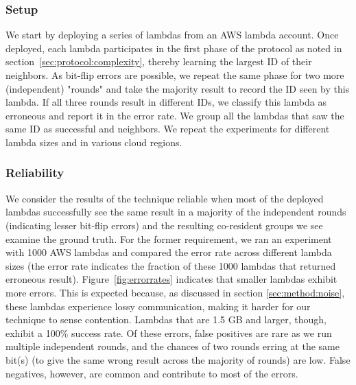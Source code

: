 \subsubsection{Setup}
\label{subsec:expsetup}
We start by deploying a series of lambdas from an AWS lambda account.  Once
deployed, each lambda participates in the first phase of the protocol as noted
in section~\ref{sec:protocol:complexity}, thereby learning the largest ID of
their neighbors. As bit-flip errors are possible, we repeat the same phase for
two more (independent) "rounds" and take the majority result to record the ID
seen by this lambda.  If all three rounds result in different IDs, we classify
this lambda as erroneous and report it in the error rate. We group all the
lambdas that saw the same ID as successful and neighbors. We repeat the
experiments for different lambda sizes and in various cloud regions.

\subsubsection{Reliability}
We consider the results of the technique reliable when most of the deployed
lambdas successfully see the same result in a majority of the independent rounds
(indicating lesser bit-flip errors) and the resulting co-resident groups we
see examine the ground truth.  For the former requirement, 
we ran an experiment with 1000 AWS
lambdas and compared the error rate across different lambda sizes (the error
rate indicates the fraction of these 1000 lambdas that returned erroneous result).
Figure~\ref{fig:errorrates} 
indicates that smaller lambdas exhibit
more errors.  This is expected because, as discussed in section
\ref{sec:method:noise}, these lambdas experience lossy communication, making it
harder for our technique to sense contention. Lambdas that are 1.5 GB and
larger, though, exhibit a 100\% success rate. Of these errors, false positives are 
rare as we run multiple independent rounds, and the chances of two rounds erring at 
the same bit(s) (to give the same wrong result across the majority of rounds) are low. 
False negatives, however, are common and contribute to most of the errors.

